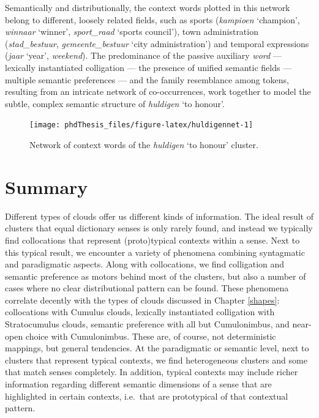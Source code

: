 \documentclass[
]{book}
\begin{document}
Semantically and distributionally, the context words plotted in this network belong to different, loosely related fields, such as sports (\emph{kampioen} `champion', \emph{winnaar} `winner', \emph{sport\_raad} `sports council'), town administration (\emph{stad\_bestuur}, \emph{gemeente\_bestuur} `city administration') and temporal expressions (\emph{jaar} `year', \emph{weekend}). The predominance of the passive auxiliary \emph{word} --- lexically instantiated colligation --- the presence of unified semantic fields --- multiple semantic preferences --- and the family resemblance among tokens, resulting from an intricate network of co-occurrences, work together to model the subtle, complex semantic structure of \emph{huldigen} `to honour'.



\begin{figure}
\texttt{[image: phdThesis\_files/figure-latex/huldigennet-1]} \caption{Network of context words of the \emph{huldigen} `to honour' cluster.}\label{fig:huldigennet}
\end{figure}

\hypertarget{theo1-summary}{%
\section{Summary}\label{theo1-summary}}

Different types of clouds offer us different kinds of information. The ideal result of clusters that equal dictionary senses is only rarely found, and instead we typically find collocations that represent (proto)typical contexts within a sense. Next to this typical result, we encounter a variety of phenomena combining syntagmatic and paradigmatic aspects. Along with collocations, we find colligation and semantic preference as motors behind most of the clusters, but also a number of cases where no clear distributional pattern can be found. These phenomena correlate decently with the types of clouds discussed in Chapter \ref{shapes}: collocations with Cumulus clouds, lexically instantiated colligation with Stratocumulus clouds, semantic preference with all but Cumulonimbus, and near-open choice with Cumulonimbus. These are, of course, not deterministic mappings, but general tendencies.
At the paradigmatic or semantic level, next to clusters that represent typical contexts, we find heterogeneous clusters and some that match senses completely. In addition, typical contexts may include richer information regarding different semantic dimensions of a sense that are highlighted in certain contexts, i.e.~that are prototypical of that contextual pattern.
\end{document}
